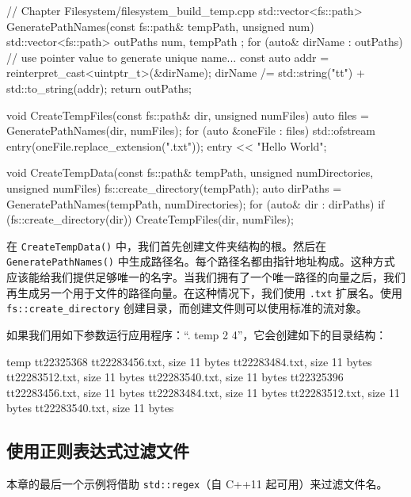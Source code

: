 \begin{codebox}[cpp]
// Chapter Filesystem/filesystem_build_temp.cpp
std::vector<fs::path> GeneratePathNames(const fs::path& tempPath,
                                        unsigned num)
{
    std::vector<fs::path> outPaths{ num, tempPath };
    for (auto& dirName : outPaths)
    {
        // use pointer value to generate unique name...
        const auto addr = reinterpret_cast<uintptr_t>(&dirName);
        dirName /= std::string("tt") + std::to_string(addr);
    }
    return outPaths;
}

void CreateTempFiles(const fs::path& dir, unsigned numFiles)
{
    auto files = GeneratePathNames(dir, numFiles);
    for (auto &oneFile : files)
    {
        std::ofstream entry(oneFile.replace_extension(".txt"));
        entry << "Hello World";
    }
}

void CreateTempData(const fs::path& tempPath, unsigned numDirectories,
                    unsigned numFiles)
{
    fs::create_directory(tempPath);
    auto dirPaths = GeneratePathNames(tempPath, numDirectories);
    for (auto& dir : dirPaths)
    {
        if (fs::create_directory(dir))
            CreateTempFiles(dir, numFiles);
    }
}
\end{codebox}

在 \texttt{CreateTempData()} 中，我们首先创建文件夹结构的根。然后在 \texttt{GeneratePathNames()} 中生成路径名。每个路径名都由指针地址构成。这种方式应该能给我们提供足够唯一的名字。当我们拥有了一个唯一路径的向量之后，我们再生成另一个用于文件的路径向量。在这种情况下，我们使用 \texttt{.txt} 扩展名。使用 \texttt{fs::create\_directory} 创建目录，而创建文件则可以使用标准的流对象。

如果我们用如下参数运行应用程序：“. temp 2 4”，它会创建如下的目录结构：

\begin{codebox}[cpp]
temp
  tt22325368
    tt22283456.txt, size 11 bytes
    tt22283484.txt, size 11 bytes
    tt22283512.txt, size 11 bytes
    tt22283540.txt, size 11 bytes
  tt22325396
    tt22283456.txt, size 11 bytes
    tt22283484.txt, size 11 bytes
    tt22283512.txt, size 11 bytes
    tt22283540.txt, size 11 bytes
\end{codebox}

\subsection{使用正则表达式过滤文件}

本章的最后一个示例将借助 \texttt{std::regex}（自 C++11 起可用）来过滤文件名。

